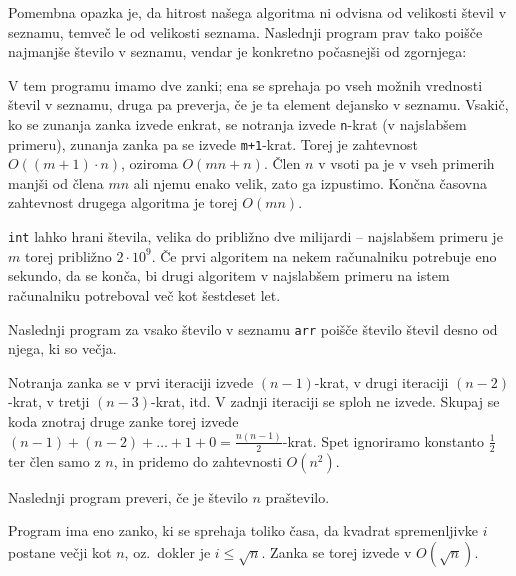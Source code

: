 \documentclass{book}
\begin{document}
Pomembna opazka je, da hitrost našega algoritma ni odvisna od velikosti števil
v seznamu, temveč le od velikosti seznama. Naslednji program prav tako poišče
najmanjše število v seznamu, vendar je konkretno počasnejši od zgornjega:


V tem programu imamo dve zanki; ena se sprehaja po vseh možnih vrednosti števil
v seznamu, druga pa preverja, če je ta element dejansko v seznamu. Vsakič, ko se
zunanja zanka izvede enkrat, se notranja izvede \verb+n+-krat (v najslabšem
primeru), zunanja zanka pa se izvede \verb|m+1|-krat. Torej je zahtevnost
\(O((m+1) \cdot n)\), oziroma \(O(mn + n)\). Člen \(n\) v vsoti pa je v vseh
primerih manjši od člena \(mn\) ali njemu enako velik, zato ga izpustimo.
Končna časovna zahtevnost drugega algoritma je torej \(O(mn)\).

\verb+int+ lahko hrani števila, velika do približno dve milijardi -- najslabšem
primeru je \(m\) torej približno \(2 \cdot 10^9\). Če prvi algoritem na nekem
računalniku potrebuje eno sekundo, da se konča, bi drugi algoritem v najslabšem
primeru na istem računalniku potreboval več kot šestdeset let.

\begin{examples}

  Naslednji program za vsako število v seznamu \verb+arr+ poišče število števil desno od njega, ki so večja.


  Notranja zanka se v prvi iteraciji izvede \((n-1)\)-krat, v drugi iteraciji
  \((n-2)\)-krat, v tretji \((n-3)\)-krat, itd. V zadnji iteraciji se sploh ne
  izvede. Skupaj se koda znotraj druge zanke torej izvede
  \((n-1) + (n-2) + \ldots + 1 + 0 = \frac{n(n-1)}{2}\)-krat. Spet ignoriramo
  konstanto \(\frac{1}{2}\) ter člen samo z \(n\), in pridemo do zahtevnosti
  \(O(n^2)\).

\end{examples}

\begin{examples}

  Naslednji program preveri, če je število \(n\) praštevilo.


  Program ima eno zanko, ki se sprehaja toliko časa, da kvadrat spremenljivke
  \(i\) postane večji kot \(n\), oz.~dokler je \(i \le \sqrt{n}\). Zanka se torej
  izvede v \(O(\sqrt{n})\).

\end{examples}
\end{document}
